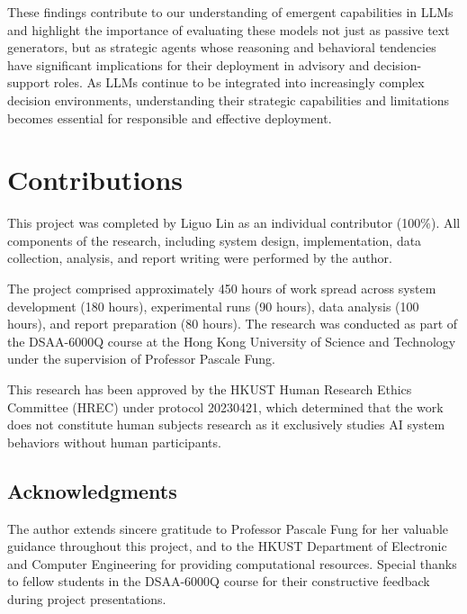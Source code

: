 \documentclass{article}
\begin{document}
These findings contribute to our understanding of emergent capabilities in LLMs and highlight the importance of evaluating these models not just as passive text generators, but as strategic agents whose reasoning and behavioral tendencies have significant implications for their deployment in advisory and decision-support roles. As LLMs continue to be integrated into increasingly complex decision environments, understanding their strategic capabilities and limitations becomes essential for responsible and effective deployment.

\section{Contributions}

This project was completed by Liguo Lin as an individual contributor (100\%). All components of the research, including system design, implementation, data collection, analysis, and report writing were performed by the author.

The project comprised approximately 450 hours of work spread across system development (180 hours), experimental runs (90 hours), data analysis (100 hours), and report preparation (80 hours). The research was conducted as part of the DSAA-6000Q course at the Hong Kong University of Science and Technology under the supervision of Professor Pascale Fung.

This research has been approved by the HKUST Human Research Ethics Committee (HREC) under protocol 20230421, which determined that the work does not constitute human subjects research as it exclusively studies AI system behaviors without human participants.

\subsection{Acknowledgments}
The author extends sincere gratitude to Professor Pascale Fung for her valuable guidance throughout this project, and to the HKUST Department of Electronic and Computer Engineering for providing computational resources. Special thanks to fellow students in the DSAA-6000Q course for their constructive feedback during project presentations.



\end{document}
